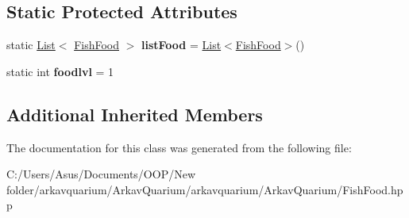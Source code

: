 \subsection*{Static Protected Attributes}
\begin{DoxyCompactItemize}
\item 
\mbox{\label{class_fish_food_afa5ef582d9cf34bab9d4531366c1f452}} 
static \mbox{\hyperlink{class_list}{List}}$<$ \mbox{\hyperlink{class_fish_food}{Fish\+Food}} $>$ {\bfseries list\+Food} = \mbox{\hyperlink{class_list}{List}}$<$\mbox{\hyperlink{class_fish_food}{Fish\+Food}}$>$()
\item 
\mbox{\label{class_fish_food_ac0964c175b990b8a2c2ef14c0fe4afee}} 
static int {\bfseries foodlvl} = 1
\end{DoxyCompactItemize}
\subsection*{Additional Inherited Members}


The documentation for this class was generated from the following file\+:\begin{DoxyCompactItemize}
\item 
C\+:/\+Users/\+Asus/\+Documents/\+O\+O\+P/\+New folder/arkavquarium/\+Arkav\+Quarium/arkavquarium/\+Arkav\+Quarium/Fish\+Food.\+hpp\end{DoxyCompactItemize}
